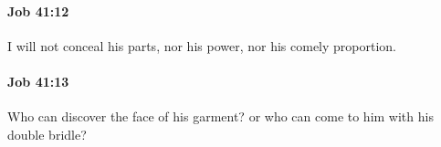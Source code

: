 		\paragraph{Job 41:12} %
			\label{JOB-41-12}

			I will not conceal his parts, nor his power, nor his comely proportion.


		\paragraph{Job 41:13} %
			\label{JOB-41-13}

			Who can discover the face of his garment? or who can come to him with his double bridle?



